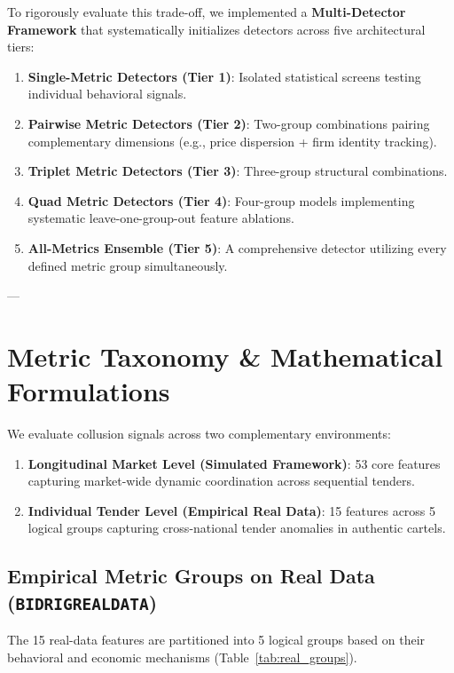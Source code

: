 \documentclass[11pt,a4paper]{article}
\renewcommand{\_}{\textunderscore\allowbreak}
\begin{document}
To rigorously evaluate this trade-off, we implemented a \textbf{Multi-Detector Framework} that systematically initializes detectors across five architectural tiers:
\begin{enumerate}[noitemsep]
    \item \textbf{Single-Metric Detectors (Tier 1)}: Isolated statistical screens testing individual behavioral signals.
    \item \textbf{Pairwise Metric Detectors (Tier 2)}: Two-group combinations pairing complementary dimensions (e.g., price dispersion + firm identity tracking).
    \item \textbf{Triplet Metric Detectors (Tier 3)}: Three-group structural combinations.
    \item \textbf{Quad Metric Detectors (Tier 4)}: Four-group models implementing systematic leave-one-group-out feature ablations.
    \item \textbf{All-Metrics Ensemble (Tier 5)}: A comprehensive detector utilizing every defined metric group simultaneously.
\end{enumerate}

---

\section{Metric Taxonomy \& Mathematical Formulations}

We evaluate collusion signals across two complementary environments:
\begin{enumerate}[noitemsep]
    \item \textbf{Longitudinal Market Level (Simulated Framework)}: 53 core features capturing market-wide dynamic coordination across sequential tenders.
    \item \textbf{Individual Tender Level (Empirical Real Data)}: 15 features across 5 logical groups capturing cross-national tender anomalies in authentic cartels.
\end{enumerate}

\subsection{Empirical Metric Groups on Real Data (\texttt{BIDRIG\_REAL\_DATA})}

The 15 real-data features are partitioned into 5 logical groups based on their behavioral and economic mechanisms (Table~\ref{tab:real_groups}).
\end{document}

